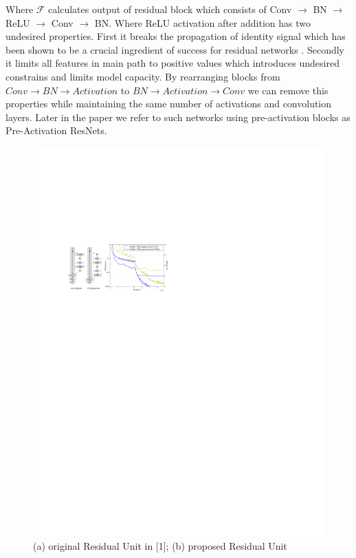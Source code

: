 Where $\mathcal{F}$ calculates output of residual block which consists of Conv $\rightarrow$ BN $\rightarrow$ ReLU $\rightarrow$ Conv $\rightarrow$ BN. Where ReLU activation after addition has two undesired properties. First it breaks the propagation of identity signal which has been shown to be a crucial ingredient of success for residual networks \cite{chao2019_hardnet}. Secondly it limits all features in main path to positive values which introduces undesired constrains and limits model capacity. By rearranging blocks from $Conv \rightarrow BN \rightarrow Activation$ to $BN \rightarrow Activation \rightarrow Conv$ we can remove this properties while maintaining the same number of activations and convolution layers. Later in the paper we refer to such networks using pre-activation blocks as Pre-Activation ResNets.


\begin{figure}[h!]
  \caption{ (a) original Residual Unit in [1]; (b) proposed Residual Unit}
  \label{fig: pre-act}
  \includegraphics[clip, trim=0cm 0cm 13.5cm 0cm, scale=.55]{images/preact1.pdf}
\end{figure}

